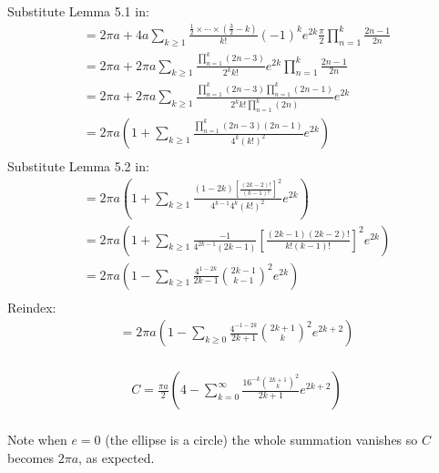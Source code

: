 \documentclass{article}
\begin{document}
Substitute Lemma 5.1 in:
\begin{equation*}
\begin{split}
	= 2\pi a + 4a\sum_{k\geq 1}\frac{\frac{1}{2}\times\cdots\times(\frac{3}{2}-k)}{k!}(-1)^ke^{2k}\frac{\pi}{2}\prod_{n=1}^k\frac{2n-1}{2n}\\
	= 2\pi a + 2\pi a\sum_{k\geq 1}\frac{\prod_{n=1}^k(2n-3)}{2^kk!}e^{2k}\prod_{n=1}^k\frac{2n-1}{2n}\\
	= 2\pi a + 2\pi a\sum_{k\geq 1}\frac{\prod_{n=1}^k(2n-3)\prod_{n=1}^k(2n-1)}{2^kk!\prod_{n=1}^k(2n)}e^{2k}\\
	= 2\pi a\left(1+\sum_{k\geq 1}\frac{\prod_{n=1}^k(2n-3)(2n-1)}{4^k(k!)^2}e^{2k}\right)\\
\end{split}
\end{equation*}
Substitute Lemma 5.2 in:
\begin{equation*}
\begin{split}
	= 2\pi a\left(1+\sum_{k\geq 1}\frac{(1-2k)\left[\frac{(2k-2)!}{(k-1)!}\right]^2}{4^{k-1}4^k(k!)^2}e^{2k}\right)\\
	= 2\pi a\left(1+\sum_{k\geq 1}\frac{-1}{4^{2k-1}(2k-1)}\left[\frac{(2k-1)(2k-2)!}{k!(k-1)!}\right]^2e^{2k}\right)\\
	= 2\pi a\left(1-\sum_{k\geq 1}\frac{4^{1-2k}}{2k-1}{{2k-1}\choose {k-1}}^2e^{2k}\right)\\
\end{split}
\end{equation*}
Reindex:
\begin{equation*}
\begin{split}
	= 2\pi a\left(1-\sum_{k\geq 0}\frac{4^{-1-2k}}{2k+1}{{2k+1}\choose k}^2e^{2k+2}\right)\\
\end{split}
\end{equation*}
\begin{tcolorbox}
\begin{equation}
\begin{split}
	C = \frac{\pi a}{2}\left(4-\sum_{k=0}^{\infty}\frac{16^{-k}{{2k+1}\choose k}^2}{2k+1}e^{2k+2}\right)\\
\end{split}
\end{equation}
\end{tcolorbox}
Note when $e=0$ (the ellipse is a circle) the whole summation vanishes so $C$ becomes $2\pi a$, as expected.
\end{document}
